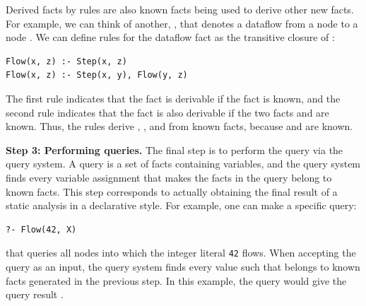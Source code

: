 Derived facts by rules are also known facts being used to derive other new
facts.
For example, we can think of another, , that denotes a
dataflow from a node  to a node .
We can define rules for the dataflow fact as the transitive closure of :

\begin{lstlisting}[style=mrule]
Flow(x, z) :- Step(x, z)
Flow(x, z) :- Step(x, y), Flow(y, z)
\end{lstlisting}

\noindent
The first rule indicates that the fact  is derivable if the
fact  is known, and the second rule indicates
that the fact  is also derivable if the two facts  and  are known.
Thus, the rules derive , , and
 from known facts, because  and
 are known.


\smallskip
\textbf{Step 3: Performing queries.}
The final step is to perform the query via the query system.  
A query is a set of facts containing variables, and the query system finds
every variable assignment that makes the facts in the query belong to known
facts.
This step corresponds to actually obtaining the final result of a static
analysis in a declarative style.  
For example, one can make a specific query:

\begin{lstlisting}[style=mrule]
?- Flow(42, X)
\end{lstlisting}

\noindent
that queries all nodes into which the integer literal {\tt 42} flows.
When accepting the query as an input, the query system finds every value
 such that  belongs to known facts generated in
the previous step. 
In this example, the query would give the query result
.

